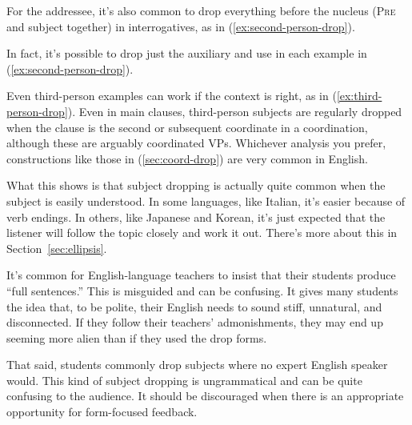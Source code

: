 \ea  \label{ex:first-person-drop}
    \z
\z
For the addressee, it's also common to drop everything before the nucleus (\textsc{Pre} and subject together) in interrogatives, as in (\ref{ex:second-person-drop}).

\ea  \label{ex:second-person-drop}
    \z
\z
In fact, it's possible to drop just the auxiliary and use  in each example in (\ref{ex:second-person-drop}).

Even third-person examples can work if the context is right, as in (\ref{ex:third-person-drop}).
\ea  \label{ex:third-person-drop}
    \z
\z
Even in main clauses, third-person subjects are regularly dropped when the clause is the second or subsequent coordinate in a coordination, although these are arguably coordinated VPs. Whichever analysis you prefer, constructions like those in (\ref{sec:coord-drop}) are very common in English.

\ea \label{sec:coord-drop}
    \z
\z
What this shows is that subject dropping is actually quite common when the subject is easily understood. In some languages, like Italian, it's easier because of verb endings. In others, like Japanese and Korean, it's just expected that the listener will follow the topic closely and work it out. There's more about this in  Section~\ref{sec:ellipsis}.

It's common for English-language teachers to insist that their students produce ``full sentences.'' This is misguided and can be confusing. It gives many students the idea that, to be polite, their English needs to sound stiff, unnatural, and disconnected. If they follow their teachers' admonishments, they may end up seeming more alien than if they used the drop forms.

That said, students commonly drop subjects where no expert English speaker would. This kind of subject dropping is ungrammatical and can be quite confusing to the audience. It should be discouraged when there is an appropriate opportunity for form-focused feedback.

